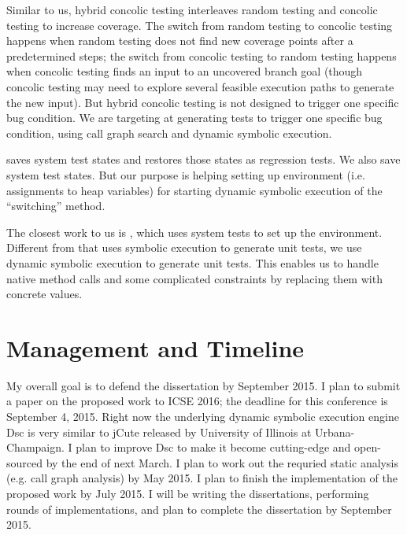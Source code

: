 \documentclass[proposal]{umthesis} %
\begin{document}
Similar to us, hybrid concolic testing\cite{Majumdar:2007:HCT:1248820.1248874} interleaves random testing and concolic testing to increase coverage.  The switch from random testing to concolic testing happens when random testing does not find new coverage points after a predetermined steps; the switch from concolic testing to random testing happens when concolic testing finds an input to an uncovered branch goal (though concolic testing may need to explore several feasible execution paths to generate the new input).  But hybrid concolic testing is not designed to trigger one specific bug condition.  We are targeting at generating tests to trigger one specific bug condition, using call graph search and dynamic symbolic execution. 

\cite{Elbaum:2006:CDU:1181775.1181806} saves system test states and restores those states as regression tests.  We also save system test states.  But our purpose is helping setting up environment (i.e. assignments to heap variables) for starting dynamic symbolic execution of the “switching” method.

The closest work to us is \cite{Pasareanu:2008:CUS:1390630.1390635}, which uses system tests to set up the environment.  Different from\cite{Pasareanu:2008:CUS:1390630.1390635} that uses symbolic execution to generate unit tests, we use dynamic symbolic execution to generate unit tests.  This enables us to handle native method calls and some complicated constraints by replacing them with concrete values. 

\chapter{Management and Timeline}
\label{chp:timeline}

My overall goal is to defend the dissertation by September 2015.  I plan to submit a paper on the proposed work to ICSE 2016; the deadline for this conference is September 4, 2015.  Right now the underlying dynamic symbolic execution engine Dsc\cite{islam10dsc+mock} is very similar to jCute\cite{sen06cute} released by University of Illinois at Urbana-Champaign. I plan to improve Dsc to make it become cutting-edge and open-sourced by the end of next March.  I plan to work out the requried static analysis (e.g. call graph analysis) by May 2015.  I plan to finish the implementation of the proposed work by July 2015.  I will be writing the dissertations, performing rounds of implementations, and plan to complete the dissertation by September 2015. 






\medskip

\end{document}
